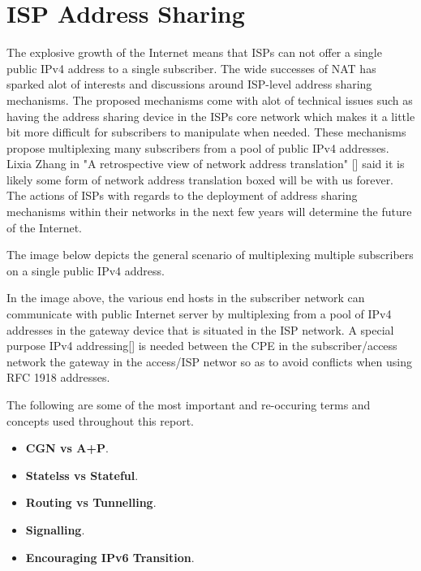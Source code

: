 \documentclass[iwp,first]{luthesis}
\begin{document}
\section{ISP Address Sharing}

The explosive growth of the Internet means that ISPs can not offer a single public IPv4 address to a single subscriber. The wide successes of NAT has sparked alot of interests and discussions around ISP-level address sharing mechanisms. The proposed mechanisms come with alot of technical issues such as having the address sharing device in the ISPs core network which makes it a little bit more difficult for subscribers to manipulate when needed. These mechanisms propose multiplexing many subscribers from a pool of public IPv4 addresses. Lixia Zhang in "A retrospective view of network address translation" [] said it is likely some form of network address translation boxed will be with us forever. The actions of ISPs with regards to the deployment of address sharing mechanisms within their networks in the next few years will determine the future of the Internet. 

The image below depicts the general scenario of multiplexing multiple subscribers on a single public IPv4 address.  

In the image above, the various end hosts in the subscriber network can communicate with public Internet server by multiplexing from a pool of IPv4 addresses in the gateway device that is situated in the ISP network. A special purpose IPv4 addressing[] is needed between the CPE in the subscriber/access network the gateway in the access/ISP networ so as to avoid conflicts when using RFC 1918 addresses. 

The following are some of the most important and re-occuring terms and concepts used throughout this report.

\begin{itemize}

	\item {\bf CGN vs A+P}.

	\item {\bf Statelss vs Stateful}.
 
	\item {\bf Routing vs Tunnelling}.

	\item {\bf Signalling}.

	\item {\bf Encouraging IPv6 Transition}.

\end{itemize}
\end{document}
